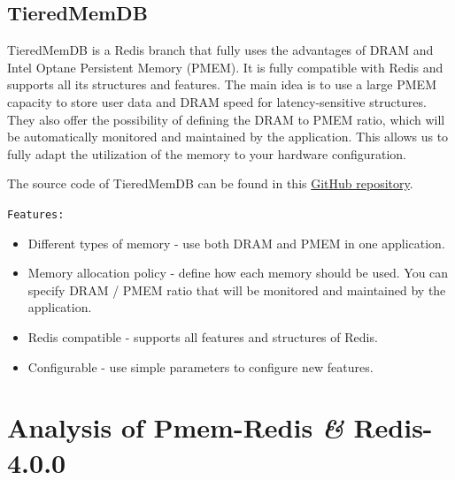 \documentclass[11pt,swedish, openany, oneside]{book}
\begin{document}
\subsection{TieredMemDB}
TieredMemDB is a Redis branch that fully uses the advantages of DRAM and Intel Optane Persistent Memory (PMEM). It is fully compatible with Redis and supports all its structures and features. The main idea is to use a large PMEM capacity to store user data and DRAM speed for latency-sensitive structures. They also offer the possibility of defining the DRAM to PMEM ratio, which will be automatically monitored and maintained by the application. This allows us to fully adapt the utilization of the memory to your hardware configuration.\cite{tdb}

The source code of TieredMemDB can be found in this \href{https://github.com/TieredMemDB/TieredMemDB}{GitHub repository}.

\texttt{Features:}
\begin{itemize}
    \item Different types of memory - use both DRAM and PMEM in one application.
    \item Memory allocation policy - define how each memory should be used. You can specify DRAM / PMEM ratio that will be monitored and maintained by the application.
    \item Redis compatible - supports all features and structures of Redis.
    \item Configurable - use simple parameters to configure new features.
\end{itemize}

\section{Analysis of Pmem-Redis \textit{\&} Redis-4.0.0}
\end{document}
